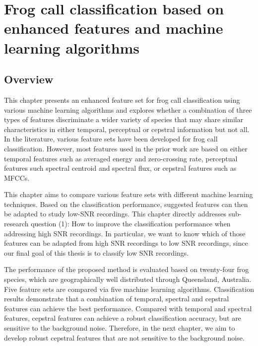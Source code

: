 
\chapter[Frog call classification based on enhanced features]{Frog call classification based on enhanced features and machine learning algorithms}
\label{cha:cha4EnhancedFeature}



\section{Overview}
\label{S:1}

This chapter presents an enhanced feature set for frog call classification using various machine learning algorithms and explores whether a combination of three types of features discriminate a wider variety of species that may share similar characteristics in either temporal, perceptual or cepstral information but not all. In the literature, various feature sets have been developed for frog call classification. However, most features used in the prior work are based on either temporal features such as averaged energy and zero-crossing rate, perceptual features such spectral centroid and spectral flux, or cepstral features such as MFCCs. 



This chapter aims to compare various feature sets with different machine learning techniques. Based on the classification performance, suggested features can then be adapted to study low-SNR recordings. This chapter directly addresses sub-research question (1): How to improve the classification performance when addressing high SNR recordings. In particular, we want to know which of those features can be adapted from high SNR recordings to low SNR recordings, since our final goal of this thesis is to classify low SNR recordings.

The performance of the proposed method is evaluated based on twenty-four frog species, which are geographically well distributed through Queensland, Australia. Five feature sets are compared via five machine learning algorithms. Classification results demonstrate that a combination of temporal, spectral and cepstral features can achieve the best performance. Compared with temporal and spectral features, cepstral features can achieve a robust classification accuracy, but are sensitive to the background noise. Therefore, in the next chapter, we aim to develop robust cepstral features that are not sensitive to the background noise.



